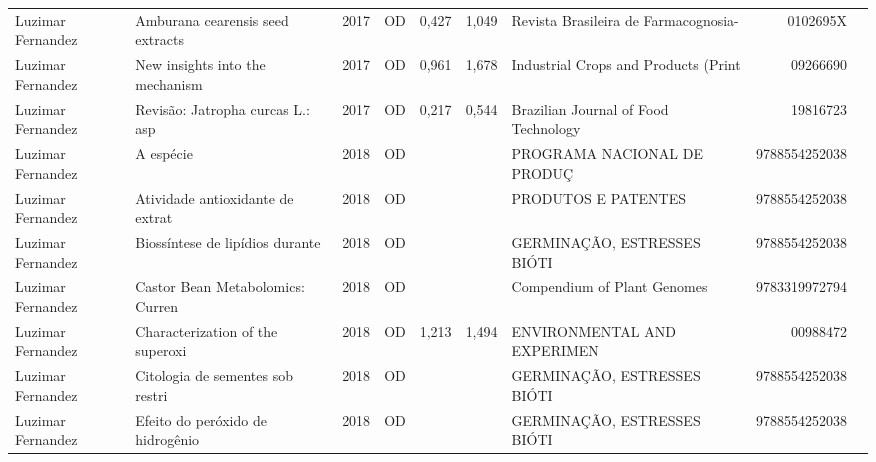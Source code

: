 \documentclass[12pt,brazil]{article}\usepackage[]{graphicx}\usepackage[]{xcolor}
\begin{document}
\begin{longtable}{lllrrllrr}
\rowcolor{duplic}\rowcolor{duplic}\rowcolor{duplic}\rowcolor{duplic}\rowcolor{duplic}\rowcolor{duplic}\rowcolor{duplic}\rowcolor{duplic}\rowcolor{duplic}\rowcolor{duplic}\rowcolor{duplic}\rowcolor{duplic}\rowcolor{duplic}\rowcolor{duplic}\rowcolor{duplic}\rowcolor{duplic}Luzimar Fernandez & Amburana cearensis seed extracts & 2017 & OD & 0,427 & 1,049 & Revista Brasileira de Farmacognosia- & 0102695X \\
\rowcolor{coautr}\rowcolor{coautr}\rowcolor{coautr}\rowcolor{coautr}\rowcolor{coautr}\rowcolor{coautr}\rowcolor{coautr}\rowcolor{coautr}\rowcolor{coautr}\rowcolor{coautr}\rowcolor{coautr}\rowcolor{coautr}\rowcolor{coautr}\rowcolor{coautr}\rowcolor{coautr}\rowcolor{coautr}Luzimar Fernandez & New insights into the mechanism  & 2017 & OD & 0,961 & 1,678 & Industrial Crops and Products (Print & 09266690 \\
Luzimar Fernandez & Revisão: Jatropha curcas L.: asp & 2017 & OD & 0,217 & 0,544 & Brazilian Journal of Food Technology & 19816723 \\
Luzimar Fernandez & A espécie & 2018 & OD &  &  & PROGRAMA NACIONAL DE PRODUÇ & 9788554252038 \\
\rowcolor{coautr}\rowcolor{coautr}\rowcolor{coautr}\rowcolor{coautr}\rowcolor{coautr}\rowcolor{coautr}\rowcolor{coautr}\rowcolor{coautr}\rowcolor{coautr}\rowcolor{coautr}\rowcolor{coautr}\rowcolor{coautr}\rowcolor{coautr}\rowcolor{coautr}\rowcolor{coautr}\rowcolor{coautr}Luzimar Fernandez & Atividade antioxidante de extrat & 2018 & OD &  &  & PRODUTOS E PATENTES & 9788554252038 \\
Luzimar Fernandez & Biossíntese de lipídios durante  & 2018 & OD &  &  & GERMINAÇÃO, ESTRESSES BIÓTI & 9788554252038 \\
Luzimar Fernandez & Castor Bean Metabolomics: Curren & 2018 & OD &  &  & Compendium of Plant Genomes & 9783319972794 \\
\rowcolor{coautr}\rowcolor{coautr}\rowcolor{coautr}\rowcolor{coautr}\rowcolor{coautr}\rowcolor{coautr}\rowcolor{coautr}\rowcolor{coautr}\rowcolor{coautr}\rowcolor{coautr}\rowcolor{coautr}\rowcolor{coautr}\rowcolor{coautr}\rowcolor{coautr}\rowcolor{coautr}\rowcolor{coautr}Luzimar Fernandez & Characterization of the superoxi & 2018 & OD & 1,213 & 1,494 & ENVIRONMENTAL AND EXPERIMEN & 00988472 \\
Luzimar Fernandez & Citologia de sementes sob restri & 2018 & OD &  &  & GERMINAÇÃO, ESTRESSES BIÓTI & 9788554252038 \\
Luzimar Fernandez & Efeito do peróxido de hidrogênio & 2018 & OD &  &  & GERMINAÇÃO, ESTRESSES BIÓTI & 9788554252038 \\

\end{longtable}
\end{document}
